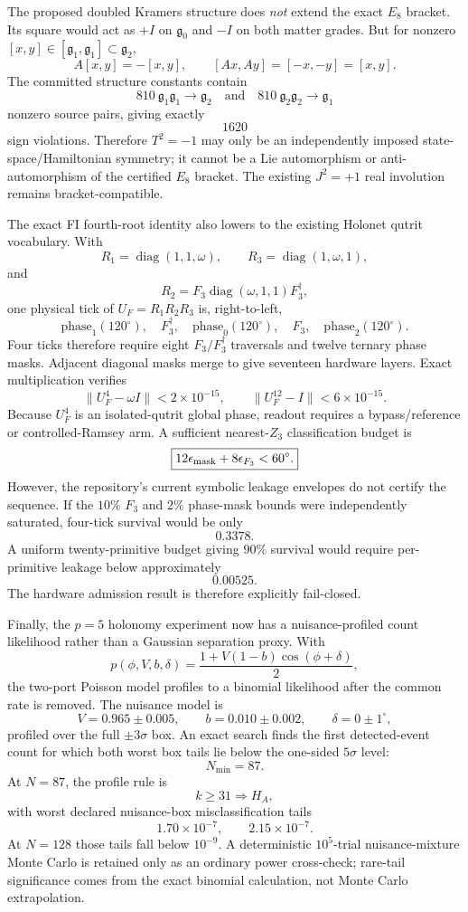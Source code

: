 The proposed doubled Kramers structure does \emph{not} extend the exact
\(E_8\) bracket.  Its square would act as \(+I\) on
\(\mathfrak g_0\) and \(-I\) on both matter grades.  But for nonzero
\([x,y]\in[\mathfrak g_1,\mathfrak g_1]\subset\mathfrak g_2\),
\[
A[x,y]=-[x,y],
\qquad
[Ax,Ay]=[-x,-y]=[x,y].
\]
The committed structure constants contain
\[
\boxed{
810\ \mathfrak g_1\mathfrak g_1\to\mathfrak g_2
\quad\text{and}\quad
810\ \mathfrak g_2\mathfrak g_2\to\mathfrak g_1
}
\]
nonzero source pairs, giving exactly
\[
\boxed{1620}
\]
sign violations.  Therefore \(T^2=-1\) may only be an independently imposed
state-space/Hamiltonian symmetry; it cannot be a Lie automorphism or
anti-automorphism of the certified \(E_8\) bracket.  The existing
\(J^2=+1\) real involution remains bracket-compatible.

The exact FI fourth-root identity also lowers to the existing Holonet qutrit
vocabulary.  With
\[
R_1=\operatorname{diag}(1,1,\omega),\qquad
R_3=\operatorname{diag}(1,\omega,1),
\]
and
\[
R_2=F_3\operatorname{diag}(\omega,1,1)F_3^\dagger,
\]
one physical tick of \(U_F=R_1R_2R_3\) is, right-to-left,
\[
\text{phase}_{1}(120^\circ),
\quad
F_3^\dagger,
\quad
\text{phase}_{0}(120^\circ),
\quad
F_3,
\quad
\text{phase}_{2}(120^\circ).
\]
Four ticks therefore require eight \(F_3/F_3^\dagger\) traversals and
twelve ternary phase masks.  Adjacent diagonal masks merge to give seventeen
hardware layers.  Exact multiplication verifies
\[
\boxed{
\|U_F^4-\omega I\|<2\times10^{-15},
\qquad
\|U_F^{12}-I\|<6\times10^{-15}.
}
\]
Because \(U_F^4\) is an isolated-qutrit global phase, readout requires a
bypass/reference or controlled-Ramsey arm.  A sufficient nearest-\(Z_3\)
classification budget is
\[
\boxed{
12\epsilon_{\rm mask}
+
8\epsilon_{F_3}
<
60^\circ.
}
\]
However, the repository's current symbolic leakage envelopes do not certify
the sequence.  If the \(10\%\) \(F_3\) and \(2\%\) phase-mask bounds
were independently saturated, four-tick survival would be only
\[
\boxed{0.3378}.
\]
A uniform twenty-primitive budget giving \(90\%\) survival would require
per-primitive leakage below approximately
\[
\boxed{0.00525}.
\]
The hardware admission result is therefore explicitly fail-closed.

Finally, the \(p=5\) holonomy experiment now has a nuisance-profiled count
likelihood rather than a Gaussian separation proxy.  With
\[
p(\phi,V,b,\delta)
=
\frac{1+V(1-b)\cos(\phi+\delta)}{2},
\]
the two-port Poisson model profiles to a binomial likelihood after the common
rate is removed.  The nuisance model is
\[
V=0.965\pm0.005,
\qquad
b=0.010\pm0.002,
\qquad
\delta=0\pm1^\circ,
\]
profiled over the full \(\pm3\sigma\) box.  An exact search finds the
first detected-event count for which both worst box tails lie below the
one-sided \(5\sigma\) level:
\[
\boxed{N_{\min}=87}.
\]
At \(N=87\), the profile rule is
\[
\boxed{k\ge31\Rightarrow H_A},
\]
with worst declared nuisance-box misclassification tails
\[
\boxed{
1.70\times10^{-7},
\qquad
2.15\times10^{-7}.
}
\]
At \(N=128\) those tails fall below \(10^{-9}\).  A deterministic
\(10^5\)-trial nuisance-mixture Monte Carlo is retained only as an ordinary
power cross-check; rare-tail significance comes from the exact binomial
calculation, not Monte Carlo extrapolation.

